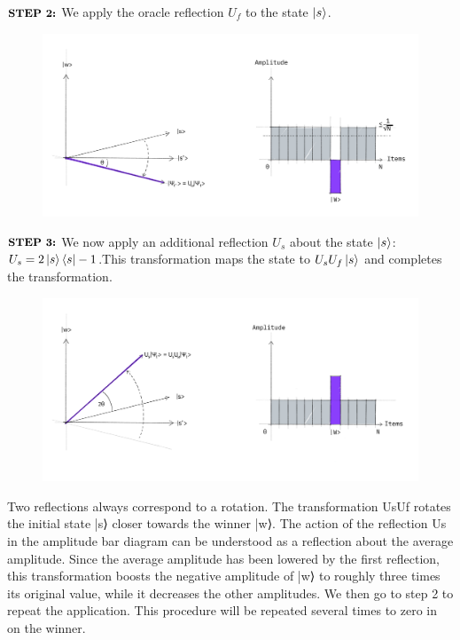 \documentclass[letterpaper,11pt]{article}
\begin{document}
{\newline 
$\small\textbf{STEP 2:}$  We apply the oracle reflection $U_f$ to the state $\ket {s}$.

\begin{figure}[h!]
    \includegraphics[width=\linewidth]{grover_step2.jpg}
\end{figure}
$\small\textbf{STEP 3:}$
We now apply an additional reflection $U_s$ about the state $\ket{s}$: $U_s = 2\ket{s}\bra{s} - 1$.This transformation maps the state to $U_s U_f \ket{s}$ and completes the transformation.
\begin{figure}[h!]
    \centering
    \includegraphics[width=\linewidth]{grover_step3.jpg}
\end{figure}
\par 
Two reflections always correspond to a rotation. The transformation UsUf rotates the initial state |s⟩ closer towards the winner |w⟩. The action of the reflection Us in the amplitude bar diagram can be understood as a reflection about the average amplitude. Since the average amplitude has been lowered by the first reflection, this transformation boosts the negative amplitude of |w⟩ to roughly three times its original value, while it decreases the other amplitudes. We then go to step 2 to repeat the application. This procedure will be repeated several times to zero in on the winner.
}
\end{document}
